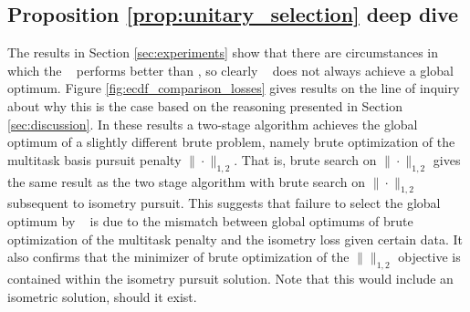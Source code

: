 \newpage

\subsection{Proposition \ref{prop:unitary_selection} deep dive}
\label{sec:deep_dive}

The results in Section \ref{sec:experiments} show that there are circumstances in which the \greedy~ performs better than \tsip, so clearly \tsip~ does not always achieve a global optimum.
Figure \ref{fig:ecdf_comparison_losses} gives results on the line of inquiry about why this is the case based on the reasoning presented in Section \ref{sec:discussion}.
In these results a two-stage algorithm achieves the global optimum of a slightly different brute problem, namely brute optimization of the multitask basis pursuit penalty $\|\cdot \|_{1,2}$.
That is, brute search on $\|\cdot \|_{1,2}$ gives the same result as the two stage algorithm with brute search on $\|\cdot \|_{1,2}$ subsequent to isometry pursuit.
This suggests that failure to select the global optimum by \tsip~ is due to the mismatch between global optimums of brute optimization of the multitask penalty and the isometry loss given certain data.
It also confirms that the minimizer of brute optimization of the $\|\|_{1,2}$ objective is contained within the isometry pursuit solution.
Note that this would include an isometric solution, should it exist.

